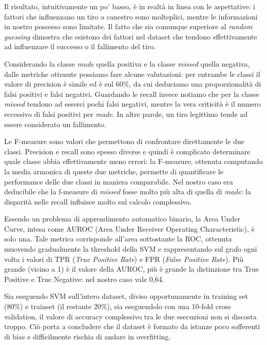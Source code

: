 Il risultato, intuitivamente un po' basso, è in realtà in linea con le aspettative: i fattori che influenzano un tiro a canestro sono molteplici, mentre le informazioni in nostro possesso sono limitate. Il fatto che sia comunque  superiore al \textit{random guessing} dimostra che esistono dei fattori nel dataset che tendono effettivamente ad influenzare il successo o il fallimento del tiro.

\par
Considerando la classe \textit{made} quella positiva e la classe \textit{missed} quella negativa, dalle metriche ottenute possiamo fare alcune valutazioni: per entrambe le classi il valore di precision è simile ed è sul 60\%, da cui deduciamo una proporzionalità di falsi positivi e falsi negativi.
Guardando le recall invece notiamo che per la classe \textit{missed} tendono ad esserci pochi falsi negativi, mentre la vera criticità è il numero eccessivo di falsi positivi per \textit{made}. In altre parole, un tiro legittimo tende ad essere considerato un fallimento.

Le F-measure sono valori che permettono di confrontare direttamente le due classi. Precision e recall sono spesso diverse e quindi è complicato determinare quale classe abbia effettivamente meno errori: la F-measure, ottenuta computando la media armonica di queste due metriche, permette di quantificare le performance delle due classi in maniera comparabile. Nel nostro caso era deducibile che la f-measure di \textit{missed} fosse molto più alta di quella di \textit{made}: la disparità nelle recall influisce molto sul calcolo complessivo.

Essendo un problema di apprendimento automatico binario, la Area Under Curve, intesa come AUROC (Area Under Receiver Operating Characteristic), è solo una. Tale metrica corrisponde all'area sottostante la ROC, ottenuta muovendo gradualmente la threshold della SVM e rappresentando sul grafo ogni volta i valori di TPR (\textit{True Positive Rate}) e FPR (\textit{False Positive Rate}).
Più grande (vicino a 1) è il valore della AUROC, più è grande la distinzione tra True Positive e True Negative: nel nostro caso vale 0,64.

\par
Sia eseguendo SVM sull'intero dataset, diviso opportunamente in training set (80\%) e trainset (il restante 20\%), sia eseguendolo con una 10-fold cross validation, il valore di accuracy complessivo tra le due esecuzioni non si discosta troppo. Ciò porta a concludere che il dataset è formato da istanze poco sofferenti di bias e difficilmente rischia di andare in overfitting.

